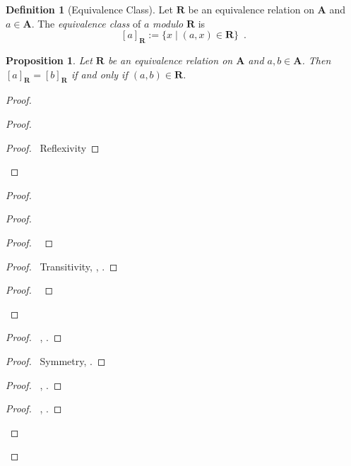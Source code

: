 \documentclass{book}
\let\qed\relax
\newtheorem{prop}[ax]{Proposition}
\theoremstyle{definition}
\newtheorem{df}[ax]{Definition}
\begin{document}
\begin{df}[Equivalence Class]
Let $\mathbf{R}$ be an equivalence relation on $\mathbf{A}$ and $a \in \mathbf{A}$. The \emph{equivalence class} of $a$ \emph{modulo} $\mathbf{R}$ is
\[ [a]_{\mathbf{R}} := \{ x \mid (a,x) \in \mathbf{R} \} \enspace . \]
\end{df}

\begin{prop}
\label{prop:eqclassequal}
Let $\mathbf{R}$ be an equivalence relation on $\mathbf{A}$ and $a,b \in \mathbf{A}$. Then $[a]_\mathbf{R} = [b]_\mathbf{R}$ if and only if $(a,b) \in \mathbf{R}$.
\end{prop}

\begin{proof}
\pf
{}
\begin{proof}
	\begin{proof}
		\pf\ Reflexivity
	\end{proof}
\end{proof}
\begin{proof}
	\begin{proof}
		\begin{proof}
			\pf\ 
		\end{proof}
		\begin{proof}
			\pf\ Transitivity, , .
		\end{proof}
		\begin{proof}
			\pf\ 
		\end{proof}
	\end{proof}
	\begin{proof}
		\pf\ , .
	\end{proof}
	\begin{proof}
		\pf\ Symmetry, .
	\end{proof}
	\begin{proof}
		\pf\ , .
	\end{proof}
	\begin{proof}
		\pf\ , .
	\end{proof}
\end{proof}
\qed
\end{proof}
\end{document}
